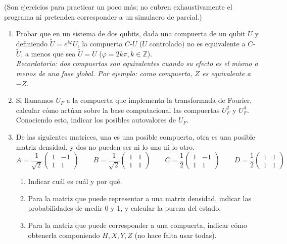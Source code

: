 \documentclass[a4paper,11pt,spanish]{article}
\begin{document}

\medskip

(Son ejercicios para practicar un poco más; no cubren exhaustivamente el programa ni pretenden corresponder a un simulacro de parcial.)

\medskip

\begin{enumerate}
%
%
  \item Probar que en un sistema de dos qubits, dada una compuerta de un qubit $U$ y definiendo $\tilde U = e^{i\varphi}U$, la compuerta $C$-$U$ ($U$ controlado) no es equivalente a $C$-$\tilde U$, a menos que sea $\tilde U = U$ ($\varphi = 2k\pi, k \in \mathbb{Z}$).\\
  {\it Recordatorio: dos compuertas son equivalentes cuando su efecto es el mismo a menos de una fase global. Por ejemplo: como compuerta, $Z$ es equivalente a $-Z$.}
  \medskip

  \item Si llamamos $U_F$ a la compuerta que implementa la transformada de Fourier, calcular c\'omo act\'uan sobre la base computacional las compuertas $U_F^2$ y $U_F^4$. Conociendo esto, indicar los posibles autovalores de $U_F$.

  \item De las siguientes matrices, una es una posible compuerta, otra es una posible matriz densidad, y dos no pueden ser ni lo uno ni lo otro.
  $$
  A=\frac{1}{\sqrt{2}}
  \begin{pmatrix}
   1 & -1\\ 1 & 1
  \end{pmatrix}
  \quad
  \quad
  B=\frac{1}{\sqrt{2}}
  \begin{pmatrix}
   1 & 1\\ 1 & 1
  \end{pmatrix}
  \quad
  \quad
  C=\frac{1}{2}
  \begin{pmatrix}
   1 & -1\\ 1 & 1
  \end{pmatrix}
  \quad
  \quad
  D=\frac{1}{2}
  \begin{pmatrix}
   1 & 1\\ 1 & 1
  \end{pmatrix}
   $$
   \begin{enumerate}
    \item Indicar cuál es cuál y por qué.
    \item Para la matriz que puede representar a una matriz densidad, indicar las probabilidades de medir 0 y 1, y calcular la pureza del estado.
    \item Para la matriz que puede corresponder a una compuerta, indicar cómo obtenerla componiendo $H, X, Y, Z$ (no hace falta usar todas).
   \end{enumerate}


\end{enumerate}
\end{document}
